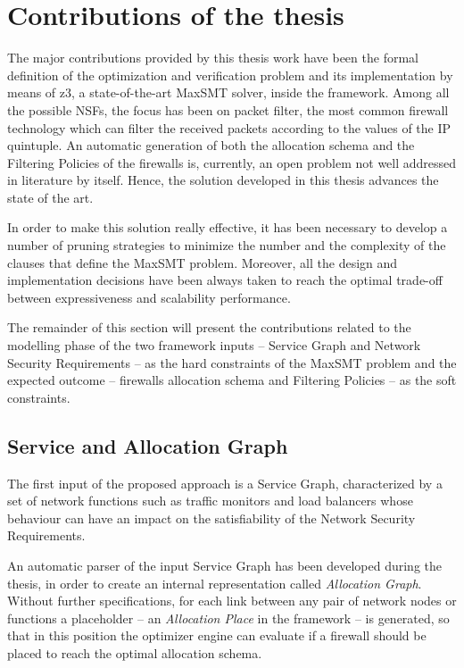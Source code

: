 \documentclass[10pt,a4paper,roman, twocolumn]{article}
\begin{document}
\section{Contributions of the thesis}

The major contributions provided by this thesis work have been the formal definition of the optimization and verification problem and its implementation by means of z3, a state-of-the-art MaxSMT solver, inside the framework. Among all the possible NSFs, the focus has been on packet filter, the most common firewall technology which can filter the received packets according to the values of the IP quintuple. An automatic generation of both the allocation schema and the Filtering Policies of the firewalls is, currently, an open problem not well addressed in literature by itself. Hence, the solution developed in this thesis advances the state of the art.

In order to make this solution really effective, it has been necessary to develop a number of pruning strategies to minimize the number and the complexity of the clauses that define the MaxSMT problem. Moreover, all the design and implementation decisions have been always taken to reach the optimal trade-off between expressiveness and scalability performance.

The remainder of this section will present the contributions related to the modelling phase of the two framework inputs -- Service Graph and Network Security Requirements -- as the hard constraints of the MaxSMT problem and the expected outcome -- firewalls allocation schema and Filtering Policies -- as the soft constraints. 

\subsection{Service and Allocation Graph}

The first input of the proposed approach is a Service Graph, characterized by a set of network functions such as traffic monitors and load balancers whose behaviour can have an impact on the satisfiability of the Network Security Requirements.

An automatic parser of the input Service Graph has been developed during the thesis, in order to create an internal representation called \textit{Allocation Graph}. Without further specifications, for each link between any pair of network nodes or functions a placeholder -- an \textit{Allocation Place} in the framework -- is generated, so that in this position the optimizer engine can evaluate if a firewall should be placed to reach the optimal allocation schema. 
\end{document}
